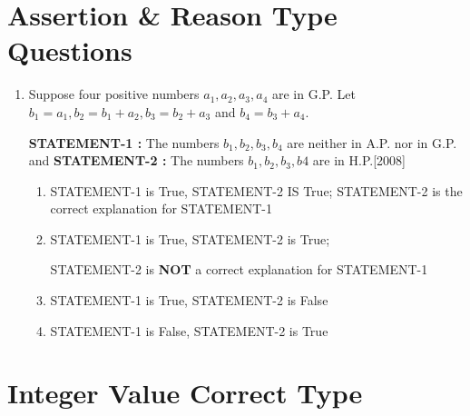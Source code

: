 \documentclass[journal,12pt,twocolumn]{IEEEtran}
\theoremstyle{remark}
\begin{document}
\section{\textbf{Assertion \& Reason Type Questions}}
\begin{enumerate}
    

\item Suppose four positive numbers $a_{1},a_{2},a_{3},a_{4}$ are in G.P. Let $b_{1} = a_{1}, b_{2} = b_{1} + a_{2}, b_{3} = b_{2} + a_{3}$ and $b_{4} = b_{3} + a_{4}$.

\textbf{STATEMENT-1 :} The numbers $b_{1},b_{2},b_{3},b_{4}$ are neither in A.P. nor in G.P. and \textbf{STATEMENT-2 :} The numbers $b_{1},b_{2},b_{3},b{4}$ are in H.P.\hfill[2008]

\begin{enumerate}
    

\item STATEMENT-1 is True, STATEMENT-2 IS True; STATEMENT-2 is the correct explanation for STATEMENT-1

\item STATEMENT-1 is True, STATEMENT-2 is True;

STATEMENT-2 is \textbf{NOT} a correct explanation for STATEMENT-1

\item STATEMENT-1 is True, STATEMENT-2 is False

\item STATEMENT-1 is False, STATEMENT-2 is True
\end{enumerate}
\end{enumerate}
\section{\textbf{Integer Value Correct Type}}
\end{document}
